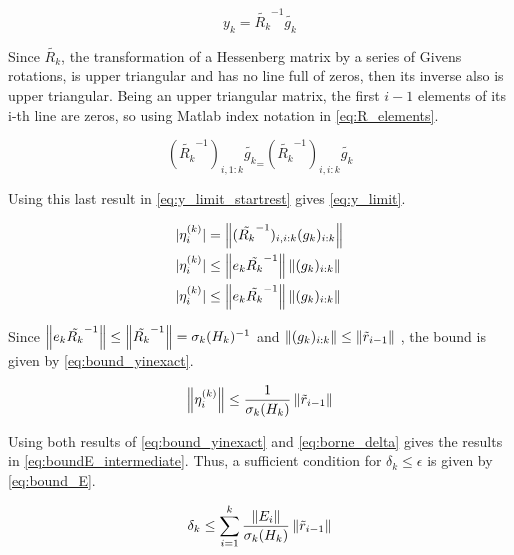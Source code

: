 \begin{equation}\label{eq:y_limit_startrest}
    y_{k} = \tilde{R_{k}}^{-1}\tilde{g_{k}}
\end{equation}

Since $\tilde{R_{k}}$, the transformation of a Hessenberg matrix by a series of Givens rotations, is upper triangular and has no line full of zeros, then its inverse also is upper triangular.
Being an upper triangular matrix, the first $i-1$ elements of its i-th line are zeros, so using Matlab index notation in \ref{eq:R_elements}.

\begin{equation}\label{eq:R_elements}
    (\tilde{R_{k}}^{-1})_{i,1:k}\tilde{g_{k}}_ = (\tilde{R_{k}}^{-1})_{i,i:k}\tilde{g_{k}}
\end{equation}

Using this last result in \ref{eq:y_limit_startrest} gives \ref{eq:y_limit}.

\begin{align}\label{eq:y_limit}
    \begin{split}
        |\eta^{(k)}_{i}| &= \left\lVert(\tilde{R_{k}}^{-1})_{i,i:k}(g_{k})_{i:k}\right\rVert\\
        |\eta^{(k)}_{i}| &\leq \left\lVert e_{k}\tilde{R_{k}}^{-1}\right\rVert \left\lVert(g_{k})_{i:k}\right\rVert\\
        |\eta^{(k)}_{i}| &\leq \left\lVert e_{k}\tilde{R_{k}}^{-1}\right\rVert \left\lVert(g_{k})_{i:k}\right\rVert\\
    \end{split}
\end{align}

Since $\left\lVert e_{k}\tilde{R_{k}}^{-1}\right\rVert \leq \left\lVert\tilde{R_{k}}^{-1}\right\rVert = \sigma_{k}(H_{k})^{-1}$ and $\left\lVert(g_{k})_{i:k}\right\rVert \leq \left\lVert\tilde{r}_{i-1}\right\rVert$ \cite{simoncini2003theory}, the bound is given by \ref{eq:bound_yinexact}.

\begin{equation}\label{eq:bound_yinexact}
    \left\lVert\eta_{i}^{(k)}\right\rVert \leq \frac{1}{\sigma_{k}(H_{k})} \left\lVert\tilde{r}_{i-1}\right\rVert
\end{equation}

Using both results of \ref{eq:bound_yinexact} and \ref{eq:borne_delta} gives the results in \ref{eq:boundE_intermediate}. Thus, a sufficient condition for $\delta_{k} \leq \epsilon$ is given by \ref{eq:bound_E}.


\begin{equation}\label{eq:boundE_intermediate}
    \delta_{k} \leq \sum_{i=1}^{k} \frac{\left\lVert E_{i}\right\rVert}{\sigma_{k}(H_{k})}\left\lVert\tilde{r}_{i-1}\right\rVert
\end{equation}

